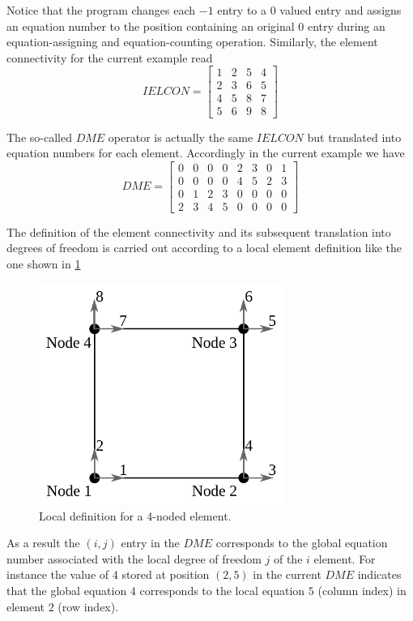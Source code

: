 Notice that the program changes each $-1$ entry to a $0$ valued entry and assigns an equation number to the position containing an original $0$ entry during an equation-assigning and equation-counting operation. Similarly, the element connectivity for the current example read
\[IELCON = \begin{bmatrix}
1 &2 &5 &4\\
2 &3 &6 &5\\
4 &5 &8 &7\\
5 &6 &9 &8
\end{bmatrix}\]

The so-called $DME$ operator is actually the same $IELCON$ but translated into equation numbers for each element. Accordingly in the current example we have
\[DME = \begin{bmatrix}
0 &0 &0 &0 &2 &3 &0 &1\\
0 &0 &0 &0 &4 &5 &2 &3\\
0 &1 &2 &3 &0 &0 &0 &0\\
2 &3 &4 &5 &0 &0 &0 &0
\end{bmatrix}\]

The definition of the element connectivity and its subsequent translation into degrees of freedom is carried out according to a local element definition like the one shown in \cref{fig:locdof}

\begin{figure}[H]\label{fig:locdof}
\centering
\includegraphics[width=8cm]{localdof.pdf}
\caption{Local definition for a 4-noded element.}
\end{figure}

As a result the $(i,j)$ entry in the $DME$ corresponds to the global equation number associated with the local degree of freedom $j$ of the $i$ element. For instance the value of $4$ stored at position $(2,5)$ in the current $DME$ indicates that the global equation $4$ corresponds to the local equation $5$ (column index) in element $2$ (row index).

